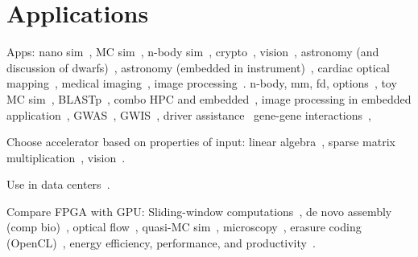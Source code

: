 \section{Applications}
\label{sec:apps}

Apps:
nano sim~\cite{khdo06},
MC sim~\cite{shsc08,tttl10},
n-body sim~\cite{tl10},
crypto~\cite{dfg+13,kl10},
vision~\cite{bkdb10,brf14,ghgb11},
astronomy (and discussion of dwarfs)~\cite{ibs12},
astronomy (embedded in instrument)~\cite{kgb+14},
cardiac optical mapping~\cite{mjk12},
medical imaging~\cite{szb+12,sll13},
image processing~\cite{dbd+13}.
n-body, mm, fd, options~\cite{whk+13},
toy MC sim~\cite{admb14},
BLASTp~\cite{Papad14},
combo HPC and embedded~\cite{rpm+15},
image processing in embedded application~\cite{enr+18,nsg+16,zxl+18},
GWAS~\cite{kws+16},
GWIS~\cite{wkhe17},
driver assistance~\cite{wlhk17}
gene-gene interactions~\cite{wkhe18},

Choose accelerator based on properties of input:
linear algebra~\cite{sll+13},
sparse matrix multiplication~\cite{gsbh16},
vision~\cite{mfo+16}.

Use in data centers~\cite{fds+17}.

Compare FPGA with GPU: Sliding-window computations~\cite{cfbs15},
de novo assembly (comp bio)~\cite{mjk+16},
optical flow~\cite{bnw+10}, quasi-MC sim~\cite{tb10},
microscopy~\cite{tzwz15}, erasure coding (OpenCL)~\cite{czs+16},
energy efficiency, performance, and productivity~\cite{cdde13}.
